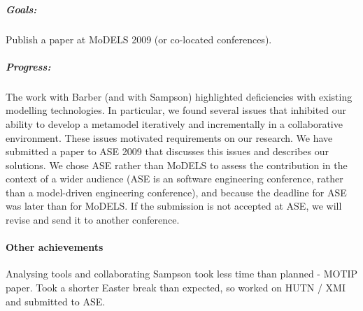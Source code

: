 \subparagraph{Goals:} Publish a paper at MoDELS 2009 (or co-located conferences).

\subparagraph{Progress:} The work with Barber (and with Sampson) highlighted deficiencies with existing modelling technologies. In particular, we found several issues that inhibited our ability to develop a metamodel iteratively and incrementally in a collaborative environment. These issues motivated requirements on our research. We have submitted a paper to ASE 2009 that discusses this issues and describes our solutions. We chose ASE rather than MoDELS to assess the contribution in the context of a wider audience (ASE is an software engineering conference, rather than a model-driven engineering conference), and because the deadline for ASE was later than for MoDELS. If the submission is not accepted at ASE, we will revise and send it to another conference.



\paragraph{Other achievements} Analysing tools and collaborating Sampson took less time than planned - MOTIP paper. Took a shorter Easter break than expected, so worked on HUTN / XMI and submitted to ASE.